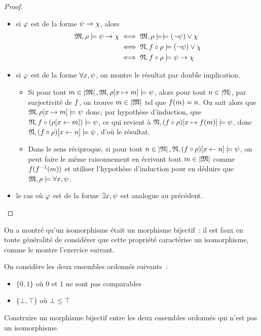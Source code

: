 \begin{proof}
\begin{itemize}
  \item si $\varphi$ est de la forme $\psi\to \chi$, alors
    \begin{align*}
      \mathfrak{M},\rho\models \psi\to \chi &\iff
      \mathfrak{M},\rho\models\models (\lnot \psi)\lor \chi\\
      &\iff \mathfrak{N},f\circ\rho\models (\lnot \psi) \lor \chi\\
      &\iff \mathfrak{N},f\circ\rho\models \psi \to \chi
    \end{align*}
  \item si $\varphi$ est de la forme $\forall x,\psi$,
    on montre le résultat par double implication.
    \begin{itemize}
    \item[\fbox{$\Rightarrow$}]Si pour tout
      $m \in \left\vert \mathfrak{M}\right\vert, \mathfrak{M},\rho[x\mapsto m]\models \psi$, alors
      pour tout $n \in \left\vert \mathfrak{N}\right\vert$, par surjectivité de $f$, on trouve
      $m \in \left\vert \mathfrak{M}\right\vert$ tel que $f(m) = n$. On sait alors que
      $\mathfrak{M},\rho[x\mapsto m]\models \psi$ donc, par hypothèse d'induction,
      que $\mathfrak{N},f\circ(\rho[x\leftarrow m])\models \psi$,
      ce qui revient
      à $\mathfrak{N},(f\circ\rho)[x\mapsto f(m)]\models \psi$, donc
      $\mathfrak{N},(f\circ\rho)[x\leftarrow n]\models \psi$,
      d'où le résultat.
    \item[\fbox{$\Leftarrow$}] Dans le sens réciproque, si pour tout
      $n\in\left\vert \mathfrak{N}\right\vert, \mathfrak{N},(f\circ\rho)[x\leftarrow n]\models\psi$,
      on peut faire le même raisonnement en écrivant tout $m \in \left\vert \mathfrak{M}\right\vert$
      comme $f(f^{-1}(m))$ et utiliser l'hypothèse d'induction pour
      en déduire que $\mathfrak{M},\rho\models \forall x,\psi$.
    \end{itemize}
  \item le cas où $\varphi$ est de la forme $\exists x, \psi$ est analogue au
    précédent. \qedhere
  \end{itemize}
\end{proof}

On a montré qu'un isomorphisme était un morphisme bijectif~: il est faux en
toute généralité de considérer que cette propriété caractérise un isomorphisme,
comme le montre l'exercice suivant.

\begin{exercise}
  On considère les deux ensembles ordonnés suivants~:
  \begin{itemize}
  \item $\{0,1\}$ où $0$ et $1$ ne sont pas comparables
  \item $\{\bot,\top\}$ où $\bot \leq \top$
  \end{itemize}
  Construire un morphisme bijectif entre les deux ensembles ordonnés qui n'est
  pas un isomorphisme.
\end{exercise}

